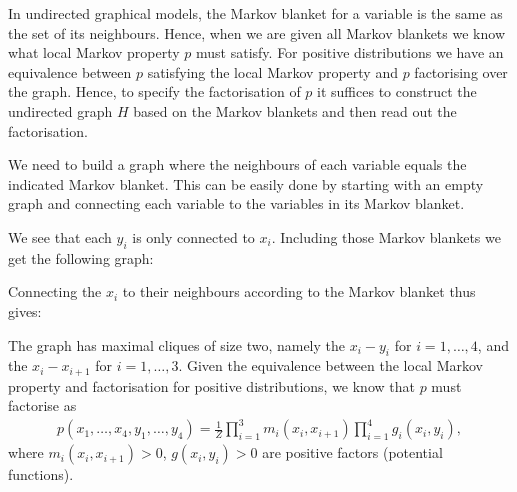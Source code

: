 \begin{solution}
In undirected graphical models, the Markov blanket for a variable is
the same as the set of its neighbours. Hence, when we are given all
Markov blankets we know what local Markov property $p$ must
satisfy. For positive distributions we have an equivalence between $p$
satisfying the local Markov property and $p$ factorising over the
graph. Hence, to specify the factorisation of $p$ it suffices to
construct the undirected graph $H$ based on the Markov blankets and
then read out the factorisation.

We need to build a graph where the neighbours of each variable equals
the indicated Markov blanket. This can be easily done by starting with
an empty graph and connecting each variable to the variables in its
Markov blanket.

We see that each $y_i$ is only connected to $x_i$. Including those
Markov blankets we get the following graph:

\begin{center}
\end{center}

Connecting the $x_i$ to their neighbours according to the Markov blanket thus gives:

\begin{center}
\end{center}

The graph has maximal cliques of size two, namely the $x_i-y_i$ for
$i=1,\ldots, 4$, and the $x_i-x_{i+1}$ for $i=1, \ldots, 3$.  Given
the equivalence between the local Markov property and factorisation
for positive distributions, we know that $p$ must factorise as
\begin{align}
  p(x_1, \ldots, x_4, y_1, \ldots, y_4) = \frac{1}{Z} \prod_{i=1}^3 m_i(x_i,x_{i+1}) \prod_{i=1}^4 g_i(x_i,y_i),
\end{align}
where $m_i(x_i, x_{i+1})>0$, $g(x_i,y_i)>0$ are positive factors (potential functions).


\end{solution}
